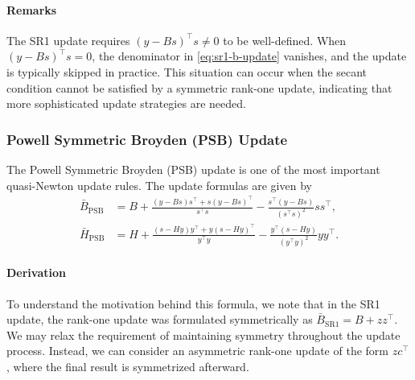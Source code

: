 \documentclass[0_en]{subfiles}
\begin{document}
\paragraph{Remarks}

The SR1 update requires $(y - Bs)^\top s \neq 0$ to be well-defined. When $(y - Bs)^\top s = 0$, the denominator in \cref{eq:sr1-b-update} vanishes, and the update is typically skipped in practice. This situation can occur when the secant condition cannot be satisfied by a symmetric rank-one update, indicating that more sophisticated update strategies are needed.

\subsubsection{Powell Symmetric Broyden (PSB) Update}

The Powell Symmetric Broyden (PSB) update \cite{haeltermanAnalyticalStudyLeast2009} is one of the most important quasi-Newton update rules. The update formulas are given by
\begin{align}
    \bar{B}_{\mathrm{PSB}} & = B + \frac{(y - B s) s^\top + s (y - B s)^\top}{s^\top s} - \frac{s^\top (y - B s)}{(s^\top s)^2} s s^\top, \label{eq:psb-b-update} \\
    \bar{H}_{\mathrm{PSB}} & = H + \frac{(s - H y) y^\top + y (s - H y)^\top}{y^\top y} - \frac{y^\top (s - H y)}{(y^\top y)^2} y y^\top. \label{eq:psb-h-update}
\end{align}

\paragraph{Derivation}

To understand the motivation behind this formula, we note that in the SR1 update, the rank-one update was formulated symmetrically as $\bar{B}_{\mathrm{SR1}} = B + z z^\top$.
We may relax the requirement of maintaining symmetry throughout the update process. Instead, we can consider an asymmetric rank-one update of the form $z c^\top$, where the final result is symmetrized afterward.
\end{document}

